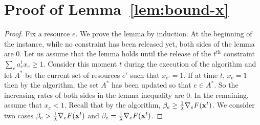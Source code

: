 
\section{Proof of Lemma~\ref{lem:bound-x}}
\label{appendix:main}

\setcounter{theorem}{3}
\BoundX*
\begin{proof}
Fix a resource $e$.
We prove the lemma by induction. At the beginning of the instance, while no constraint has been released yet,
both sides of the lemma are 0. Let us assume that the lemma holds until the release of the $t^{\text{th}}$ constraint $\sum_{e} a^{t}_{e} x_{e} \geq 1$.
Consider this moment $t$ during the execution of the algorithm
and let $A^{*}$ be the current set of resources $e'$ such that $x_{e'} = 1$.
If at time $t$, $x_{e} = 1$ then by the algorithm, the set $A^{*}$ has been updated so that
$e \in A^{*}$. So the increasing rates of both sides in the lemma inequality are 0.
In the remaining, assume that  $x_{e} < 1$.
Recall that by the algorithm, $\beta_{e} \geq \frac{1}{\lambda} \nabla_{e} F(\mathbf{x}^{t})$.
We consider two cases $\beta_{e} > \frac{1}{\lambda} \nabla_{e} F(\mathbf{x}^{t})$
and $\beta_{e} = \frac{1}{\lambda} \nabla_{e} F(\mathbf{x}^{t})$.


\end{proof}

